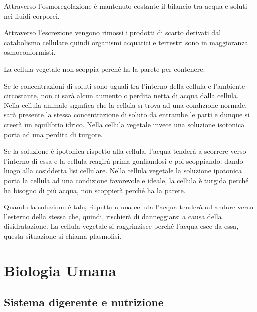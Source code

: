 \documentclass[a4paper]{article}
\begin{document}
Attraverso l'osmoregolazione è mantenuto costante il bilancio tra acqua e soluti
nei fluidi corporei.

Attraverso l'escrezione vengono rimossi i prodotti di scarto
derivati dal catabolismo cellulare quindi organismi acquatici e terrestri sono in
maggioranza osmoconformisti.

La cellula vegetale non scoppia perché ha la parete per contenere.

\wrapfill

Se le concentrazioni di soluti sono
uguali tra l'interno della cellula e l'ambiente circostante, non ci sarà
alcun aumento o perdita netta di acqua dalla cellula. \\
Nella cellula animale significa che la cellula si trova ad
una condizione normale, sarà presente la stessa concentrazione di soluto
da entrambe le parti e dunque si creerà un equilibrio idrico. Nella cellula
vegetale invece una soluzione isotonica porta ad una perdita di turgore.

Se la soluzione è ipotonica rispetto alla cellula, l'acqua tenderà a scorrere verso
l'interno di essa e la cellula reagirà prima gonfiandosi e poi scoppiando: dando luogo alla cosiddetta lisi
cellulare. Nella cellula vegetale la soluzione ipotonica porta la cellula ad una condizione favorevole e
ideale, la cellula è turgida perché ha bisogno di più acqua, non scoppierà perché ha la parete.

\pagebreak

Quando la soluzione è tale, rispetto a una cellula l'acqua tenderà ad andare
verso l'esterno della stessa che, quindi, rischierà di danneggiarsi a causa della disidratazione. La cellula
vegetale si raggrinzisce perché l'acqua esce da essa, questa situazione si chiama plasmolisi.

\pagebreak

\section{Biologia Umana}

\subsection{Sistema digerente e nutrizione}
\end{document}
